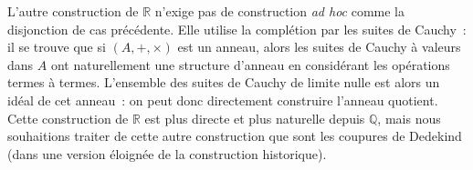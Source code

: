 \begin{remark}
  L'autre construction de $\mathbb R$ n'exige pas de construction
  \textit{ad hoc} comme la disjonction de cas précédente. Elle utilise la
  complétion par les suites de Cauchy~: il se trouve que si $(A,+,\times)$ est
  un anneau, alors les suites de Cauchy à valeurs dans $A$ ont naturellement une
  structure d'anneau en considérant les opérations termes à termes. L'ensemble
  des suites de Cauchy de limite nulle est alors un idéal de cet anneau~: on
  peut donc directement construire l'anneau quotient. Cette construction de
  $\mathbb R$ est plus directe et plus naturelle depuis $\mathbb Q$, mais nous
  souhaitions traiter de cette autre construction que sont les coupures de
  Dedekind (dans une version éloignée de la construction historique).
\end{remark}
